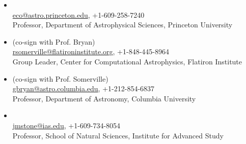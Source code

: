 \documentclass[12pt,preprint,letter]{aastex63}
\begin{document}




\begin{itemize}[itemsep=0pt,topsep=\parskip]
\item \subtitle{Eve C. Ostriker} \\
\url{eco@astro.princeton.edu}, +1-609-258-7240\\
Professor, Department of Astrophysical Sciences, Princeton University

\item \subtitle{Rachel S. Somerville} (co-sign with Prof. Bryan)\\
\url{rsomerville@flatironinstitute.org}, +1-848-445-8964\\
Group Leader, Center for Computational Astrophysics, Flatiron Institute

\item \subtitle{Greg L. Bryan} (co-sign with Prof. Somerville) \\
\url{gbryan@astro.columbia.edu}, +1-212-854-6837\\
Professor, Department of Astronomy, Columbia University

\item \subtitle{James M. Stone} \\
\url{jmstone@ias.edu}, +1-609-734-8054\\
Professor, School of Natural Sciences, Institute for Advanced Study




\end{itemize}
\end{document}
